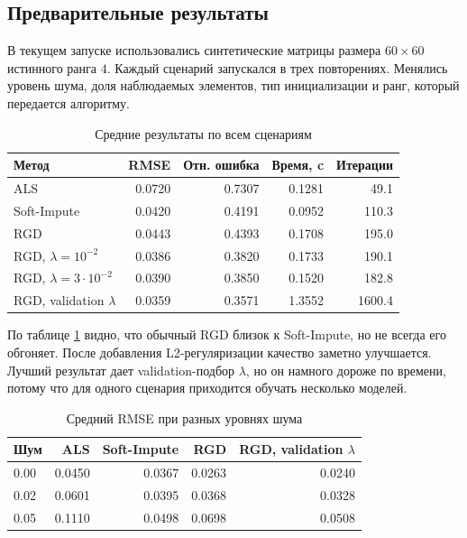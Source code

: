 \documentclass[a4paper,12pt]{article}
\begin{document}
\subsection{Предварительные результаты}

В текущем запуске использовались синтетические матрицы размера $60\times 60$ истинного ранга $4$. Каждый сценарий запускался в трех повторениях. Менялись уровень шума, доля наблюдаемых элементов, тип инициализации и ранг, который передается алгоритму.

\begin{table}[H]
    \centering
    \small
    \caption{Средние результаты по всем сценариям}
    \label{tab:main-results-final}
    \begin{tabular}{lrrrr}
        \toprule
        Метод                        & RMSE   & Отн. ошибка & Время, c & Итерации \\
        \midrule
        ALS                          & 0.0720 & 0.7307      & 0.1281   & 49.1     \\
        Soft-Impute                  & 0.0420 & 0.4191      & 0.0952   & 110.3    \\
        RGD                          & 0.0443 & 0.4393      & 0.1708   & 195.0    \\
        RGD, $\lambda=10^{-2}$       & 0.0386 & 0.3820      & 0.1733   & 190.1    \\
        RGD, $\lambda=3\cdot10^{-2}$ & 0.0390 & 0.3850      & 0.1520   & 182.8    \\
        RGD, validation $\lambda$    & 0.0359 & 0.3571      & 1.3552   & 1600.4   \\
        \bottomrule
    \end{tabular}
\end{table}

По таблице \ref{tab:main-results-final} видно, что обычный RGD близок к Soft-Impute, но не всегда его обгоняет. После добавления L2-регуляризации качество заметно улучшается. Лучший результат дает validation-подбор $\lambda$, но он намного дороже по времени, потому что для одного сценария приходится обучать несколько моделей.

\begin{table}[H]
    \centering
    \small
    \caption{Средний RMSE при разных уровнях шума}
    \label{tab:noise-results-final}
    \begin{tabular}{lrrrr}
        \toprule
        Шум  & ALS    & Soft-Impute & RGD    & RGD, validation $\lambda$ \\
        \midrule
        0.00 & 0.0450 & 0.0367      & 0.0263 & 0.0240                    \\
        0.02 & 0.0601 & 0.0395      & 0.0368 & 0.0328                    \\
        0.05 & 0.1110 & 0.0498      & 0.0698 & 0.0508                    \\
        \bottomrule
    \end{tabular}
\end{table}
\end{document}
